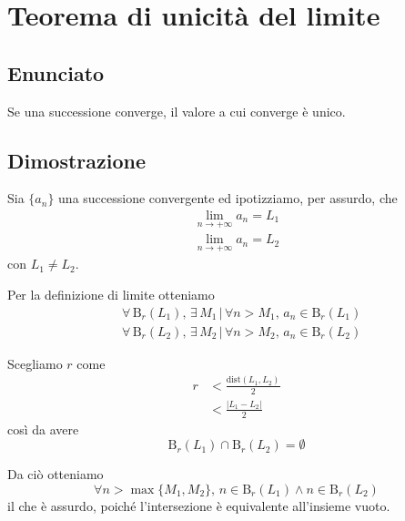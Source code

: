 \documentclass[../../dimostrazioni]{subfiles}
\begin{document}
    \chapter{Teorema di unicità del limite}
    \label{disBernoulli}

        \section*{Enunciato}

            Se una successione converge, il valore a cui converge è unico.

        \section*{Dimostrazione}

            Sia \(\{a_n\}\) una successione convergente ed ipotizziamo, per assurdo, che
            \begin{align*}
                \lim_{n \to +\infty} a_n = L_1\\
                \lim_{n \to +\infty} a_n = L_2
            \end{align*}
            con \(L_1 \neq L_2\).

            Per la definizione di limite otteniamo
            \begin{align*}
                &\forall \, \mathrm{B}_r (L_1), \, \exists \, M_1 \, | \, \forall n > M_1, \, a_n \in \mathrm{B}_r (L_1)\\
                &\forall \, \mathrm{B}_r (L_2), \, \exists \, M_2 \, | \, \forall n > M_2, \, a_n \in \mathrm{B}_r (L_2)
            \end{align*}

            Scegliamo \(r\) come
            \begin{align*}
                r &< \frac{\mathrm{dist} (L_1, L_2)}{2}\\
                &< \frac{|L_1 - L_2|}{2}
            \end{align*}
            così da avere
            \[
                \mathrm{B}_r (L_1) \cap \mathrm{B}_r (L_2) = \emptyset
            \]

            Da ciò otteniamo
            \[
                \forall n > \max\{M_1, M_2\}, \, n \in \mathrm{B}_r (L_1) \land n \in \mathrm{B}_r (L_2)
            \]
            il che è assurdo, poiché l'intersezione è equivalente all'insieme vuoto.
    
\end{document}
